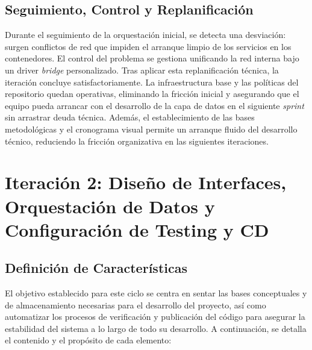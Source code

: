 \section{Seguimiento, Control y Replanificación}
Durante el seguimiento de la orquestación inicial, se detecta una desviación: surgen conflictos de red que impiden el arranque limpio de los servicios en los contenedores. El control del problema se gestiona unificando la red interna bajo un driver \textit{bridge} personalizado. Tras aplicar esta replanificación técnica, la iteración concluye satisfactoriamente. La infraestructura base y las políticas del repositorio quedan operativas, eliminando la fricción inicial y asegurando que el equipo pueda arrancar con el desarrollo de la capa de datos en el siguiente \textit{sprint} sin arrastrar deuda técnica.
Además, el establecimiento de las bases metodológicas y el cronograma visual permite un arranque fluido del desarrollo técnico, reduciendo la fricción organizativa en las siguientes iteraciones.


\chapter[Iteración 2: Interfaces, Orquestación y CI/CD]{Iteración 2: Diseño de Interfaces, Orquestación de Datos y Configuración de Testing y CD}

\section{Definición de Características}
El objetivo establecido para este ciclo se centra en sentar las bases conceptuales y de almacenamiento necesarias para el desarrollo del proyecto, así como automatizar los procesos de verificación y publicación del código para asegurar la estabilidad del sistema a lo largo de todo su desarrollo. A continuación, se detalla el contenido y el propósito de cada elemento:

